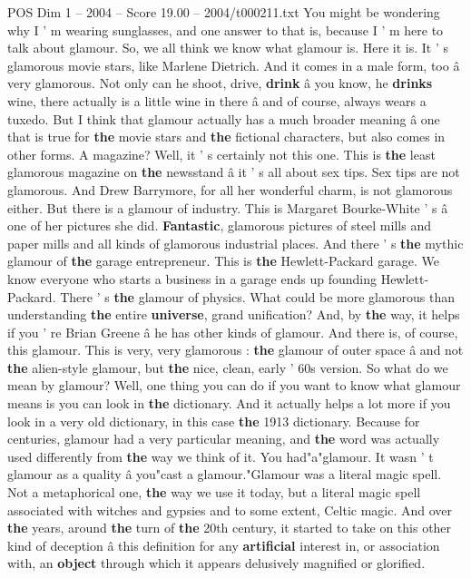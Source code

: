 \begin{textsample}{POS Dim 1 – 2004 – Score 19.00 – 2004/t000211.txt}  \label{ex:f1_pos_025}
You might be wondering why I ' m wearing sunglasses, and one answer to that is, because I ' m here to talk about glamour.
So, we all think we know what glamour is.
Here it is.
It ' s glamorous movie stars, like Marlene Dietrich.
And it comes in a male form, too â very glamorous.
Not only can he shoot, drive, \textbf{drink} â you know, he \textbf{drinks} wine, there actually is a little wine in there â and of course, always wears a tuxedo.
But I think that glamour actually has a much broader meaning â one that is true for \textbf{the} movie stars and \textbf{the} fictional characters, but also comes in other forms.
A magazine?
Well, it ' s certainly not this one.
This is \textbf{the} least glamorous magazine on \textbf{the} newsstand â it ' s all about sex tips.
Sex tips are not glamorous.
And Drew Barrymore, for all her wonderful charm, is not glamorous either.
But there is a glamour of industry.
This is Margaret Bourke-White ' s â one of her pictures she did. \textbf{Fantastic}, glamorous pictures of steel mills and paper mills and all kinds of glamorous industrial places.
And there ' s \textbf{the} mythic glamour of \textbf{the} garage entrepreneur.
This is \textbf{the} Hewlett-Packard garage.
We know everyone who starts a business in a garage ends up founding Hewlett- Packard.
There ' s \textbf{the} glamour of physics.
What could be more glamorous than understanding \textbf{the} entire \textbf{universe}, grand unification?
And, by \textbf{the} way, it helps if you ' re Brian Greene â he has other kinds of glamour.
And there is, of course, this glamour.
This is very, very glamorous : \textbf{the} glamour of outer space â and not \textbf{the} alien-style glamour, but \textbf{the} nice, clean, early ' 60s version.
So what do we mean by glamour?
Well, one thing you can do if you want to know what glamour means is you can look in \textbf{the} dictionary.
And it actually helps a lot more if you look in a very old dictionary, in this case \textbf{the} 1913 dictionary.
Because for centuries, glamour had a very particular meaning, and \textbf{the} word was actually used differently from \textbf{the} way we think of it.
You had"a"glamour.
It wasn ' t glamour as a quality â you"cast a glamour."Glamour was a literal magic spell.
Not a metaphorical one, \textbf{the} way we use it today, but a literal magic spell associated with witches and gypsies and to some extent, Celtic magic.
And over \textbf{the} years, around \textbf{the} turn of \textbf{the} 20th century, it started to take on this other kind of deception â this definition for any \textbf{artificial} interest in, or association with, an \textbf{object} through which it appears delusively magnified or glorified.

\end{textsample}
